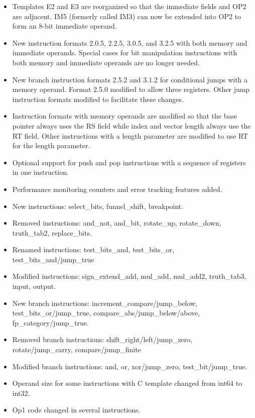 \documentclass[forwardcom.tex]{subfiles}
\begin{document}
\begin{itemize}
\item Templates E2 and E3 are reorganized so that the immediate fields and OP2 are adjacent. IM5 (formerly called IM3) can now be extended into OP2 to form an 8-bit immediate operand.

\item New instruction formats 2.0.5, 2.2.5, 3.0.5, and 3.2.5 with both memory and immediate operands. Special cases for bit manipulation instructions with both memory and immediate operands are no longer needed.

\item New branch instruction formats 2.5.2 and 3.1.2 for conditional jumps with a memory operand. Format 2.5.0 modified to allow three registers. Other jump instruction formats modified to facilitate these changes.

\item Instruction formats with memory operands are modified so that the base pointer always uses the RS field while index and vector length always use the RT field. Other instructions with a length parameter are modified to use RT for the length parameter.

\item Optional support for push and pop instructions with a sequence of registers in one instruction.

\item Performance monitoring counters and error tracking features added.

\item New instructions: select\_bits, funnel\_shift, breakpoint.

\item Removed instructions: and\_not, and\_bit, rotate\_up, rotate\_down, truth\_tab2, replace\_bits.

\item Renamed instructions: test\_bits\_and, test\_bits\_or, test\_bits\_and/jump\_true

\item Modified instructions: sign\_extend\_add, mul\_add, mul\_add2, truth\_tab3, input, output.

\item New branch instructions: increment\_compare/jump\_below, test\_bits\_or/jump\_true,  
compare\_abs/jump\_below/above, fp\_category/jump\_true.

\item Removed branch instructions: shift\_right/left/jump\_zero, 
rotate/jump\_carry, compare/jump\_finite

\item Modified branch instructions: and, or, xor/jump\_zero, test\_bit/jump\_true.

\item Operand size for some instructions with C template changed from int64 to int32.

\item Op1 code changed in several instructions.

\end{itemize}
\end{document}
